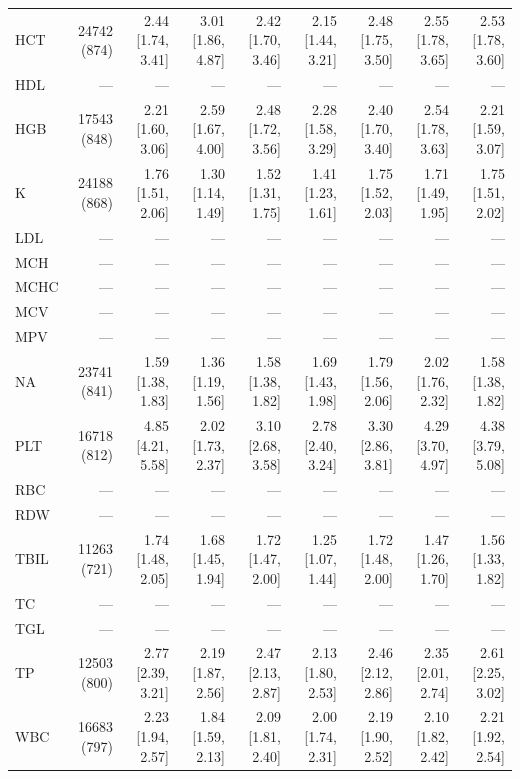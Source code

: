 \begin{table}[ht]
\begin{tabular}{lrrrrrrrr}
HCT & 24742 (874) & 2.44 [1.74, 3.41] & 3.01 [1.86, 4.87] & 2.42 [1.70, 3.46] & 2.15 [1.44, 3.21] & 2.48 [1.75, 3.50] & 2.55 [1.78, 3.65] & 2.53 [1.78, 3.60] \\
HDL & --- & --- & --- & --- & --- & --- & --- & --- \\
HGB & 17543 (848) & 2.21 [1.60, 3.06] & 2.59 [1.67, 4.00] & 2.48 [1.72, 3.56] & 2.28 [1.58, 3.29] & 2.40 [1.70, 3.40] & 2.54 [1.78, 3.63] & 2.21 [1.59, 3.07] \\
K & 24188 (868) & 1.76 [1.51, 2.06] & 1.30 [1.14, 1.49] & 1.52 [1.31, 1.75] & 1.41 [1.23, 1.61] & 1.75 [1.52, 2.03] & 1.71 [1.49, 1.95] & 1.75 [1.51, 2.02] \\
LDL & --- & --- & --- & --- & --- & --- & --- & --- \\
MCH & --- & --- & --- & --- & --- & --- & --- & --- \\
MCHC & --- & --- & --- & --- & --- & --- & --- & --- \\
MCV & --- & --- & --- & --- & --- & --- & --- & --- \\
MPV & --- & --- & --- & --- & --- & --- & --- & --- \\
NA & 23741 (841) & 1.59 [1.38, 1.83] & 1.36 [1.19, 1.56] & 1.58 [1.38, 1.82] & 1.69 [1.43, 1.98] & 1.79 [1.56, 2.06] & 2.02 [1.76, 2.32] & 1.58 [1.38, 1.82] \\
PLT & 16718 (812) & 4.85 [4.21, 5.58] & 2.02 [1.73, 2.37] & 3.10 [2.68, 3.58] & 2.78 [2.40, 3.24] & 3.30 [2.86, 3.81] & 4.29 [3.70, 4.97] & 4.38 [3.79, 5.08] \\
RBC & --- & --- & --- & --- & --- & --- & --- & --- \\
RDW & --- & --- & --- & --- & --- & --- & --- & --- \\
TBIL & 11263 (721) & 1.74 [1.48, 2.05] & 1.68 [1.45, 1.94] & 1.72 [1.47, 2.00] & 1.25 [1.07, 1.44] & 1.72 [1.48, 2.00] & 1.47 [1.26, 1.70] & 1.56 [1.33, 1.82] \\
TC & --- & --- & --- & --- & --- & --- & --- & --- \\
TGL & --- & --- & --- & --- & --- & --- & --- & --- \\
TP & 12503 (800) & 2.77 [2.39, 3.21] & 2.19 [1.87, 2.56] & 2.47 [2.13, 2.87] & 2.13 [1.80, 2.53] & 2.46 [2.12, 2.86] & 2.35 [2.01, 2.74] & 2.61 [2.25, 3.02] \\
WBC & 16683 (797) & 2.23 [1.94, 2.57] & 1.84 [1.59, 2.13] & 2.09 [1.81, 2.40] & 2.00 [1.74, 2.31] & 2.19 [1.90, 2.52] & 2.10 [1.82, 2.42] & 2.21 [1.92, 2.54] \\
\bottomrule
\end{tabular}
\label{tab:13_cox_inspire_mortality}
\end{table}